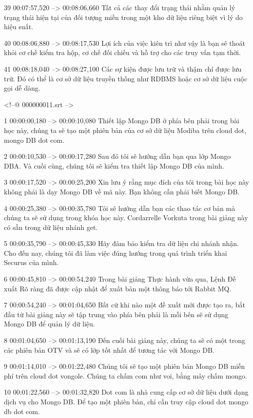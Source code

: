 39
00:07:57,520 --> 00:08:06,660
Tất cả các thay đổi trạng thái nhằm quản lý trạng thái hiện tại của đối tượng miền trong một kho dữ liệu riêng biệt vì lý do hiệu suất.

40
00:08:06,880 --> 00:08:17,530
Lợi ích của việc kiên trì như vậy là bạn sẽ thoát khỏi cơ chế kiểm tra hộp, cơ chế đối chiếu và hỗ trợ cho các truy vấn tạm thời.

41
00:08:18,040 --> 00:08:27,100
Các sự kiện được lưu trữ và thậm chí được lưu trữ.  Đó có thể là cơ sở dữ liệu truyền thống như RDBMS hoặc cơ sở dữ liệu cuộc gọi dễ dàng.

<!--@ 000000011.srt -->

1
00:00:00,180 --> 00:00:10,080
Thiết lập Mongo DB ở phía bên phải trong bài học này, chúng ta sẽ tạo một phiên bản của cơ sở dữ liệu Modiba trên cloud dot, mongo DB dot com.

2
00:00:10,530 --> 00:00:17,280
Sau đó tôi sẽ hướng dẫn bạn qua lớp Mongo DBA.  Và cuối cùng, chúng tôi sẽ kiểm tra thiết lập Mongo DB của mình.

3
00:00:17,520 --> 00:00:25,200
Xin lưu ý rằng mục đích của tôi trong bài học này không phải là dạy Mongo DB về mã này.  Bạn không cần phải biết Mongo DB.

4
00:00:25,380 --> 00:00:35,780
Tôi sẽ hướng dẫn bạn các thao tác cơ bản mà chúng ta sẽ sử dụng trong khóa học này.  Cordarrelle Vorkuta trong bài giảng này có sẵn trong dữ liệu nhánh get.

5
00:00:35,790 --> 00:00:45,330
Hãy đảm bảo kiểm tra dữ liệu chi nhánh nhận.  Cho đến nay, chúng tôi đã làm việc đúng hướng trong quá trình triển khai Securus của mình.

6
00:00:45,810 --> 00:00:54,240
Trong bài giảng Thực hành vừa qua, Lệnh Đề xuất Rõ ràng đã được cập nhật để xuất bản một thông báo tới Rabbit MQ.

7
00:00:54,240 --> 00:01:04,650
Bất cứ khi nào một đề xuất mới được tạo ra, bắt đầu từ bài giảng này sẽ tập trung vào phía bên phải là mỗi bên sẽ sử dụng Mongo DB để quản lý dữ liệu.

8
00:01:04,650 --> 00:01:13,190
Đến cuối bài giảng này, chúng ta sẽ có một trong các phiên bản OTV và sẽ có lớp tốt nhất để tương tác với Mongo DB.

9
00:01:14,010 --> 00:01:22,480
Chúng tôi sẽ tạo một phiên bản Mongo DB miễn phí trên cloud dot vongole.  Chúng ta chấm com như voi, bằng mây chấm mongo.

10
00:01:22,560 --> 00:01:32,820
Dot com là nhà cung cấp cơ sở dữ liệu dưới dạng dịch vụ cho Mongo DB.  Để tạo một phiên bản, chỉ cần truy cập cloud dot mongo db dot com.


